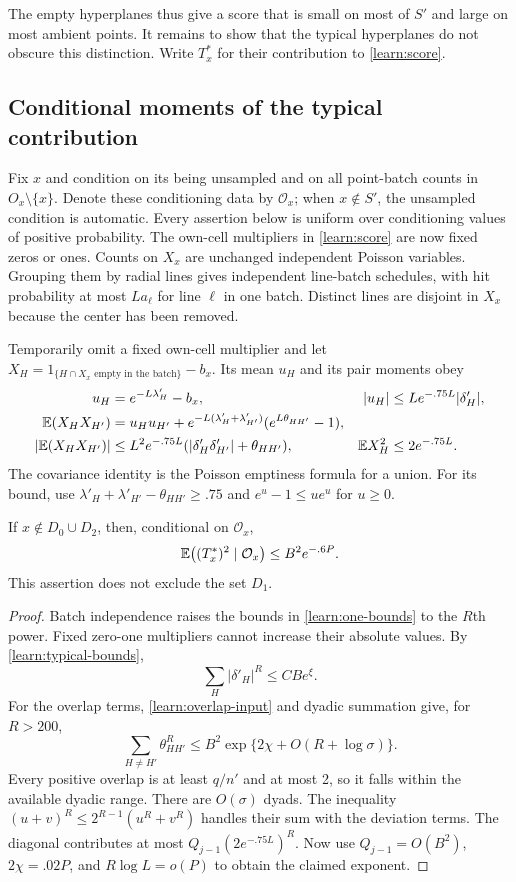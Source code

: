 The empty hyperplanes thus give a score that is small on most of $S'$
and large on most ambient points. It remains to show that the typical
hyperplanes do not obscure this distinction. Write $T_x^*$ for their
contribution to \eqref{learn:score}.

\subsection{Conditional moments of the typical contribution}

Fix $x$ and condition on its being unsampled and on all point-batch
counts in $O_x\setminus\{x\}$. Denote these conditioning data by
$\mathcal O_x$; when $x\notin S'$, the unsampled condition is automatic.
Every assertion below is uniform over conditioning values of positive
probability. The own-cell multipliers in \eqref{learn:score} are now
fixed zeros or ones. Counts on $X_x$ are unchanged independent Poisson
variables. Grouping them by radial lines gives independent
line-batch schedules, with hit probability at most $La_\ell$ for
line $\ell$ in one batch. Distinct lines are disjoint in $X_x$ because
the center has been removed.

Temporarily omit a fixed own-cell multiplier and let
$X_H=1_{\{H\cap X_x\text{ empty in the batch}\}}-b_x$.
Its mean $u_H$ and its pair moments obey
\begin{align}
 u_H&=e^{-L\lambda'_H}-b_x,
 &|u_H|&\le Le^{-.75L}|\delta'_H|,\label{learn:one-mean}\\
 \mathbb E(X_HX_{H'})
 &=u_Hu_{H'}+e^{-L(\lambda'_H+\lambda'_{H'})}
                      (e^{L\theta_{HH'}}-1),\label{learn:one-covariance}\\
 |\mathbb E(X_HX_{H'})|
 &\le L^2e^{-.75L}(|\delta'_H\delta'_{H'}|+\theta_{HH'}),
 &\mathbb E X_H^2&\le2e^{-.75L}.\label{learn:one-bounds}
\end{align}
The covariance identity is the Poisson emptiness formula for a union.
For its bound, use
$\lambda'_H+\lambda'_{H'}-\theta_{HH'}\ge .75$ and
$e^u-1\le ue^u$ for $u\ge0$.

\begin{lemma}\label{learn:second-moment}
If $x\notin D_0\cup D_2$, then, conditional on $\mathcal O_x$,
\[
 \mathbb E\bigl((T_x^*)^2\mid\mathcal O_x\bigr)
 \le B^2e^{-.6P}.
\]
This assertion does not exclude the set $D_1$.
\end{lemma}

\begin{proof}
Batch independence raises the bounds in \eqref{learn:one-bounds} to
the $R$th power. Fixed zero-one multipliers cannot increase their absolute
values. By \eqref{learn:typical-bounds},
\[
 \sum_H|\delta'_H|^R\le CBe^\xi.
\]
For the overlap terms, \eqref{learn:overlap-input} and dyadic summation
give, for $R>200$,
\[
 \sum_{H\ne H'}\theta_{HH'}^R
 \le B^2\exp\{2\chi+O(R+\log\sigma)\}.
\]
Every positive overlap is at least $q/n'$ and at most 2, so it falls
within the available dyadic range. There are $O(\sigma)$ dyads. The
inequality $(u+v)^R\le2^{R-1}(u^R+v^R)$ handles their sum with the
deviation terms. The diagonal contributes at most
$Q_{j-1}(2e^{-.75L})^R$. Now use $Q_{j-1}=O(B^2)$,
$2\chi=.02P$, and $R\log L=o(P)$ to obtain the claimed exponent.
\end{proof}

